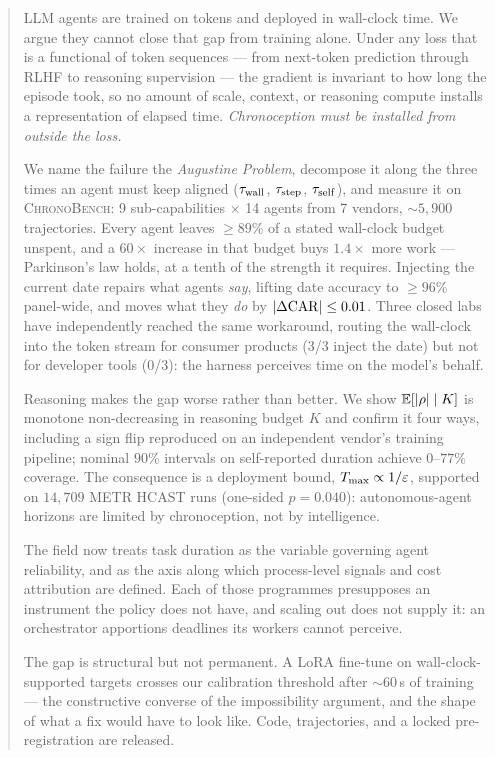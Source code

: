 \documentclass[11pt]{article}
\begin{document}
\begin{abstract}
LLM agents are trained on tokens and deployed in wall-clock time. We argue they cannot close that gap from training alone. Under any loss that is a functional of token sequences --- from next-token prediction through RLHF to reasoning supervision --- the gradient is invariant to how long the episode took, so no amount of scale, context, or reasoning compute installs a representation of elapsed time. \emph{Chronoception must be installed from outside the loss.}

We name the failure the \emph{Augustine Problem}, decompose it along the three times an agent must keep aligned ($\twall$, $\tstep$, $\tself$), and measure it on \textsc{ChronoBench}: 9 sub-capabilities $\times$ 14 agents from 7 vendors, ${\sim}5{,}900$ trajectories. Every agent leaves $\geq 89\%$ of a stated wall-clock budget unspent, and a $60\times$ increase in that budget buys $1.4\times$ more work --- Parkinson's law holds, at a tenth of the strength it requires. Injecting the current date repairs what agents \emph{say}, lifting date accuracy to $\geq 96\%$ panel-wide, and moves what they \emph{do} by $|\Delta\CAR| \leq 0.01$. Three closed labs have independently reached the same workaround, routing the wall-clock into the token stream for consumer products (3/3 inject the date) but not for developer tools (0/3): the harness perceives time on the model's behalf.

Reasoning makes the gap worse rather than better. We show $\mathbb{E}[|\confab| \mid K]$ is monotone non-decreasing in reasoning budget $K$ and confirm it four ways, including a sign flip reproduced on an independent vendor's training pipeline; nominal $90\%$ intervals on self-reported duration achieve $0$--$77\%$ coverage. The consequence is a deployment bound, $T_{\max} \propto 1/\cce$, supported on $14{,}709$ METR HCAST runs (one-sided $p = 0.040$): autonomous-agent horizons are limited by chronoception, not by intelligence.

The field now treats task duration as the variable governing agent reliability, and as the axis along which process-level signals and cost attribution are defined. Each of those programmes presupposes an instrument the policy does not have, and scaling out does not supply it: an orchestrator apportions deadlines its workers cannot perceive.

The gap is structural but not permanent. A LoRA fine-tune on wall-clock-supported targets crosses our calibration threshold after ${\sim}60$\,s of training --- the constructive converse of the impossibility argument, and the shape of what a fix would have to look like. Code, trajectories, and a locked pre-registration are released.
\end{abstract}
\end{document}
